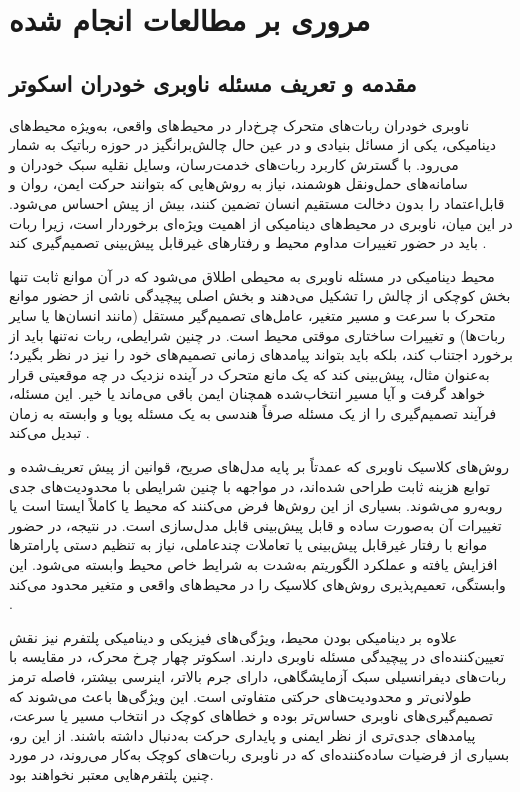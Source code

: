 
\chapter{مروری بر مطالعات انجام شده}
\section{مقدمه و تعریف مسئله ناوبری خودران اسکوتر}

ناوبری خودران ربات‌های متحرک چرخ‌دار در محیط‌های واقعی، به‌ویژه محیط‌های دینامیکی، یکی از مسائل بنیادی و در عین حال چالش‌برانگیز در حوزه رباتیک به شمار می‌رود. با گسترش کاربرد ربات‌های خدمت‌رسان، وسایل نقلیه سبک خودران و سامانه‌های حمل‌ونقل هوشمند، نیاز به روش‌هایی که بتوانند حرکت ایمن، روان و قابل‌اعتماد را بدون دخالت مستقیم انسان تضمین کنند، بیش از پیش احساس می‌شود. در این میان، ناوبری در محیط‌های دینامیکی از اهمیت ویژه‌ای برخوردار است، زیرا ربات باید در حضور تغییرات مداوم محیط و رفتارهای غیرقابل پیش‌بینی تصمیم‌گیری کند%
\cite{Zhu2021}.

محیط دینامیکی در مسئله ناوبری به محیطی اطلاق می‌شود که در آن موانع ثابت تنها بخش کوچکی از چالش را تشکیل می‌دهند و بخش اصلی پیچیدگی ناشی از حضور موانع متحرک با سرعت و مسیر متغیر، عامل‌های تصمیم‌گیر مستقل (مانند انسان‌ها یا سایر ربات‌ها) و تغییرات ساختاری موقتی محیط است. در چنین شرایطی، ربات نه‌تنها باید از برخورد اجتناب کند، بلکه باید بتواند پیامدهای زمانی تصمیم‌های خود را نیز در نظر بگیرد؛ به‌عنوان مثال، پیش‌بینی کند که یک مانع متحرک در آینده نزدیک در چه موقعیتی قرار خواهد گرفت و آیا مسیر انتخاب‌شده همچنان ایمن باقی می‌ماند یا خیر. این مسئله، فرآیند تصمیم‌گیری را از یک مسئله صرفاً هندسی به یک مسئله پویا و وابسته به زمان تبدیل می‌کند%
\cite{s25113394}.

روش‌های کلاسیک ناوبری که عمدتاً بر پایه مدل‌های صریح، قوانین از پیش تعریف‌شده و توابع هزینه ثابت طراحی شده‌اند، در مواجهه با چنین شرایطی با محدودیت‌های جدی روبه‌رو می‌شوند. بسیاری از این روش‌ها فرض می‌کنند که محیط یا کاملاً ایستا است یا تغییرات آن به‌صورت ساده و قابل پیش‌بینی قابل مدل‌سازی است. در نتیجه، در حضور موانع با رفتار غیرقابل پیش‌بینی یا تعاملات چندعاملی، نیاز به تنظیم دستی پارامترها افزایش یافته و عملکرد الگوریتم به‌شدت به شرایط خاص محیط وابسته می‌شود. این وابستگی، تعمیم‌پذیری روش‌های کلاسیک را در محیط‌های واقعی و متغیر محدود می‌کند%
\cite{s23249672}.

علاوه بر دینامیکی بودن محیط، ویژگی‌های فیزیکی و دینامیکی پلتفرم نیز نقش تعیین‌کننده‌ای در پیچیدگی مسئله ناوبری دارند. اسکوتر چهار چرخ محرک، در مقایسه با ربات‌های دیفرانسیلی سبک آزمایشگاهی، دارای جرم بالاتر، اینرسی بیشتر، فاصله ترمز طولانی‌تر و محدودیت‌های حرکتی متفاوتی است. این ویژگی‌ها باعث می‌شوند که تصمیم‌گیری‌های ناوبری حساس‌تر بوده و خطاهای کوچک در انتخاب مسیر یا سرعت، پیامدهای جدی‌تری از نظر ایمنی و پایداری حرکت به‌دنبال داشته باشند. از این رو، بسیاری از فرضیات ساده‌کننده‌ای که در ناوبری ربات‌های کوچک به‌کار می‌روند، در مورد چنین پلتفرم‌هایی معتبر نخواهند بود.


